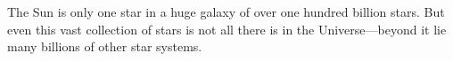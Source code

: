 The Sun is only one star in a huge galaxy of over one hundred billion
stars. But even this vast collection of stars is not all there is in the
Universe—beyond it lie many billions of other star systems.
